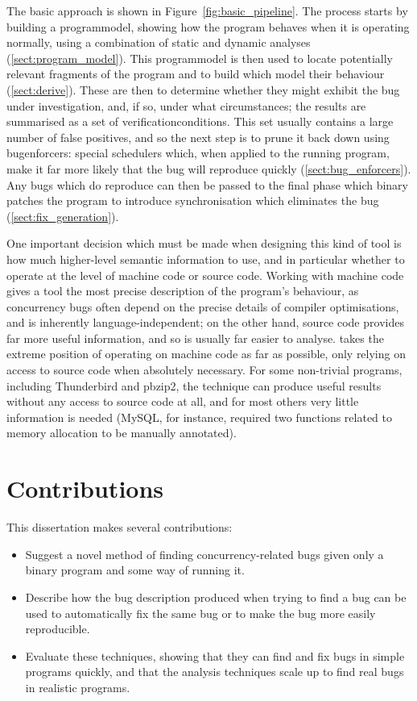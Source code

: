 The basic approach is shown in Figure~\ref{fig:basic_pipeline}.  The
process starts by building a \gls{programmodel}, showing how the
program behaves when it is operating normally, using a combination of
static and dynamic analyses (\autoref{sect:program_model}).  This
\gls{programmodel} is then used to locate potentially relevant fragments
of the program and to build {\StateMachines} which model their
behaviour (\autoref{sect:derive}).  These {\StateMachines} are
then  to determine whether they might
exhibit the bug under investigation, and, if so, under what
circumstances; the results are summarised as a set
of \glspl{verificationcondition}.  This set usually contains a large
number of false positives, and so the next step is to prune it back
down using \glspl{bugenforcer}: special schedulers which, when applied
to the running program, make it far more likely that the bug will
reproduce quickly (\autoref{sect:bug_enforcers}).  Any bugs which do
reproduce can then be passed to the final 
phase which binary patches the program to introduce synchronisation
which eliminates the bug (\autoref{sect:fix_generation}).

One important decision which must be made when designing this kind of
tool is how much higher-level semantic information to use, and in
particular whether to operate at the level of machine code or source
code.  Working with machine code gives a tool the most precise
description of the program's behaviour, as concurrency bugs often
depend on the precise details of compiler optimisations, and is
inherently language-independent; on the other hand, source code
provides far more useful information, and so is usually far easier to
analyse.  {\Technique} takes the extreme position of operating on
machine code as far as possible, only relying on access to source code
when absolutely necessary.  For some non-trivial programs, including
Thunderbird and pbzip2, the technique can produce useful results
without any access to source code at all, and for most others very
little information is needed (MySQL, for instance, required two
functions related to memory allocation to be manually annotated).

\section{Contributions}

This dissertation makes several contributions:

\begin{itemize}
\item
  Suggest a novel method of finding concurrency-related bugs given
  only a binary program and some way of running it.
\item
  Describe how the bug description produced when trying to find a bug
  can be used to automatically fix the same bug or to make the bug
  more easily reproducible.
\item
  Evaluate these techniques, showing that they can find and fix bugs
  in simple programs quickly, and that the analysis techniques scale
  up to find real bugs in realistic programs.
\end{itemize}

